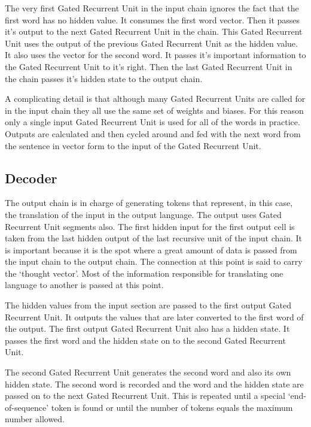 The very first Gated Recurrent Unit in the input chain ignores the fact that the first word has no hidden value. It consumes the first word vector. Then it passes it's output to the next Gated Recurrent Unit in the chain. This Gated Recurrent Unit uses the output of the previous Gated Recurrent Unit as the hidden value. It also uses the vector for the second word. It passes it's important information to the Gated Recurrent Unit to it's right. Then the last Gated Recurrent Unit in the chain passes it's hidden state to the output chain.

A complicating detail is that although many Gated Recurrent Units are called for in the input chain they all use the same set of weights and biases. For this reason only a single input Gated Recurrent Unit is used for all of the words in practice. Outputs are calculated and then cycled around and fed with the next word from the sentence in vector form to the input of the Gated Recurrent Unit. 

\subsection*{Decoder}
The output chain is in charge of generating tokens that represent, in this case, the translation of the input in the output language. The output uses Gated Recurrent Unit segments also. The first hidden input for the first output cell is taken from the last hidden output of the last recursive unit of the input chain. It is important because it is the spot where a great amount of data is passed from the input chain to the output chain. The connection at this point is said to carry the `thought vector'. Most of the information responsible for translating one language to another is passed at this point.

The hidden values from the input section are passed to the first output Gated Recurrent Unit. It outputs the values that are later converted to the first word of the output. The first output Gated Recurrent Unit also has a hidden state. It passes the first word and the hidden state on to the second Gated Recurrent Unit.

The second Gated Recurrent Unit generates the second word and also its own hidden state. The second word is recorded and the word and the hidden state are passed on to the next Gated Recurrent Unit. This is repeated until a special `end-of-sequence' token is found or until the number of tokens equals the maximum number allowed.

